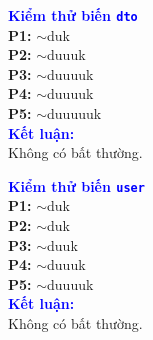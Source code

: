 \documentclass[11pt,a4paper]{article}
\begin{document}
\noindent
\begin{minipage}[t]{0.485\textwidth}
\begin{tcolorbox}[colback=white, colframe=darkblue!35, boxrule=0.6pt, arc=2pt, left=4pt, right=4pt, top=4pt, bottom=4pt]
\begin{minipage}[t]{0.43\linewidth}
\scriptsize
\textbf{\textcolor{blue}{Kiểm thử biến \texttt{dto}}}\\[4pt]
\textbf{P1:} $\sim$duk\\
\textbf{P2:} $\sim$duuuk\\
\textbf{P3:} $\sim$duuuuk\\
\textbf{P4:} $\sim$duuuuk\\
\textbf{P5:} $\sim$duuuuuk\\[6pt]
\textbf{\textcolor{blue}{Kết luận:}}\\
Không có bất thường.
\end{minipage}\hfill
\begin{minipage}[t]{0.55\linewidth}
\centering
\def\lblStart{d(dto)}%
\def\lblAone{u(dto)}%
\def\lblAtwo{}%
\def\lblAthree{}%
\def\lblAfour{u(dto)}%
\def\lblAfive{}%
\def\lblAsix{u(dto)}%
\def\lblAseven{u(dto)}%
\def\lblAeight{}%
\def\lblAnine{u(dto)}%
\def\lblAten{u(dto)}%
\def\lblAeleven{}%
\def\lblAtwelve{}%
\def\lblAthirteen{}%
\def\lblAfourteen{u(dto)}%
\resizebox{\linewidth}{!}{\DrawAssignRoleVarDFG}
\end{minipage}
\end{tcolorbox}
\end{minipage}\hfill
\begin{minipage}[t]{0.485\textwidth}
\begin{tcolorbox}[colback=white, colframe=darkblue!35, boxrule=0.6pt, arc=2pt, left=4pt, right=4pt, top=4pt, bottom=4pt]
\begin{minipage}[t]{0.43\linewidth}
\scriptsize
\textbf{\textcolor{blue}{Kiểm thử biến \texttt{user}}}\\[4pt]
\textbf{P1:} $\sim$duk\\
\textbf{P2:} $\sim$duk\\
\textbf{P3:} $\sim$duuk\\
\textbf{P4:} $\sim$duuuk\\
\textbf{P5:} $\sim$duuuuk\\[6pt]
\textbf{\textcolor{blue}{Kết luận:}}\\
Không có bất thường.
\end{minipage}\hfill
\begin{minipage}[t]{0.55\linewidth}
\centering
\def\lblStart{}%
\def\lblAone{d(user)}%
\def\lblAtwo{u(user)}%
\def\lblAthree{}%
\def\lblAfour{}%
\def\lblAfive{}%
\def\lblAsix{}%
\def\lblAseven{u(user)}%
\def\lblAeight{}%
\def\lblAnine{}%
\def\lblAten{u(user)}%
\def\lblAeleven{}%
\def\lblAtwelve{}%
\def\lblAthirteen{}%
\def\lblAfourteen{u(user)}%
\resizebox{\linewidth}{!}{\DrawAssignRoleVarDFG}
\end{minipage}
\end{tcolorbox}
\end{minipage}
\end{document}
